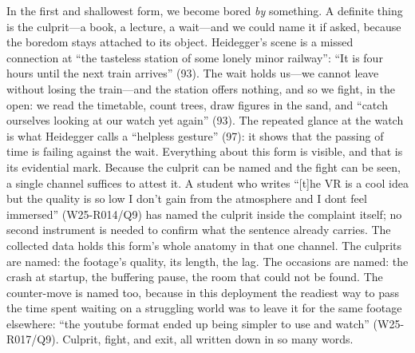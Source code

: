 In the first and shallowest form, we become bored \textit{by}
something. A definite thing is the culprit---a book, a lecture, a
wait---and we could name it if asked, because the boredom stays
attached to its object. Heidegger's scene is a missed connection at
``the tasteless station of some lonely minor railway'': ``It is four
hours until the next train arrives'' (93). The wait holds us---we
cannot leave without losing the train---and the station offers
nothing, and so we fight, in the open: we read the timetable, count
trees, draw figures in the sand, and ``catch ourselves looking at our
watch yet again'' (93). The repeated glance at the watch is what
Heidegger calls a ``helpless gesture'' (97): it shows that the passing
of time is failing against the wait. Everything about this form is
visible, and that is its evidential mark. Because the culprit can be
named and the fight can be seen, a single channel suffices to attest
it. A student who writes ``[t]he VR is a cool idea but the quality is so
low I don't gain from the atmosphere and I dont feel immersed''
(W25-R014/Q9) has named the culprit inside the complaint itself; no
second instrument is needed to confirm what the sentence already
carries. The collected data holds this form's whole anatomy in
that one channel. The culprits are named: the footage's quality, its
length, the lag. The occasions are named: the crash at startup, the
buffering pause, the room that could not be found. The counter-move is
named too, because in this deployment the readiest way
to pass the time spent waiting on a struggling world was to leave it
for the same footage elsewhere: ``the youtube format ended up being
simpler to use and watch'' (W25-R017/Q9). Culprit, fight, and exit,
all written down in so many words.

